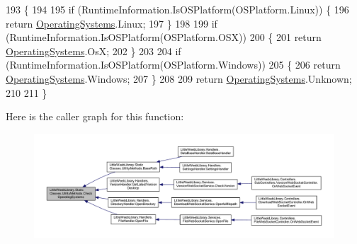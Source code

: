 \begin{DoxyCode}
193         \{
194 
195             \textcolor{keywordflow}{if} (RuntimeInformation.IsOSPlatform(OSPlatform.Linux)) \{
196                 \textcolor{keywordflow}{return} \mbox{\hyperlink{class_little_weeb_library_1_1_static_classes_1_1_utility_methods_aad4a2807f22b8cb65b8db3cdc981a0b1}{OperatingSystems}}.Linux;
197             \}
198 
199             \textcolor{keywordflow}{if} (RuntimeInformation.IsOSPlatform(OSPlatform.OSX))
200             \{
201                 \textcolor{keywordflow}{return} \mbox{\hyperlink{class_little_weeb_library_1_1_static_classes_1_1_utility_methods_aad4a2807f22b8cb65b8db3cdc981a0b1}{OperatingSystems}}.OsX;
202             \}
203 
204             \textcolor{keywordflow}{if} (RuntimeInformation.IsOSPlatform(OSPlatform.Windows))
205             \{
206                 \textcolor{keywordflow}{return} \mbox{\hyperlink{class_little_weeb_library_1_1_static_classes_1_1_utility_methods_aad4a2807f22b8cb65b8db3cdc981a0b1}{OperatingSystems}}.Windows;
207             \}
208 
209             \textcolor{keywordflow}{return} \mbox{\hyperlink{class_little_weeb_library_1_1_static_classes_1_1_utility_methods_aad4a2807f22b8cb65b8db3cdc981a0b1}{OperatingSystems}}.Unknown;
210 
211         \}
\end{DoxyCode}
Here is the caller graph for this function\+:\nopagebreak
\begin{figure}[H]
\begin{center}
\leavevmode
\includegraphics[width=350pt]{class_little_weeb_library_1_1_static_classes_1_1_utility_methods_afc8c716f32bc35d59afdb287be06c3ca_icgraph}
\end{center}
\end{figure}
\mbox{\label{class_little_weeb_library_1_1_static_classes_1_1_utility_methods_a9fe4cf5d219f0453436fe9c85ad261bf}} 
